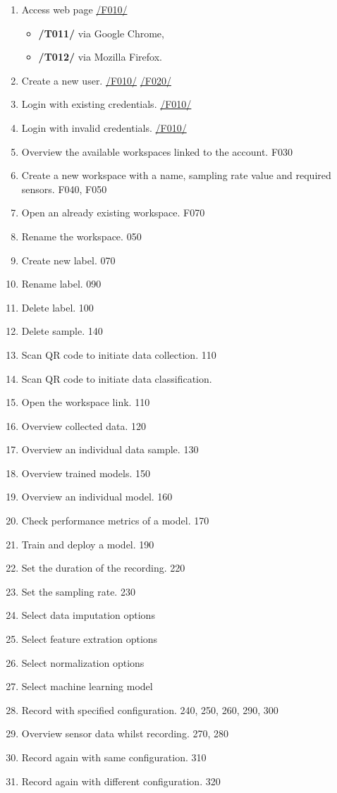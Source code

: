 \begin{enumerate}[{label = \textbf{/T{\protect\twodigits{\arabic{enumi}}}0/}, leftmargin = *}]
    \item Access web page \hyperref[welcome_page]{/F010/}
    \begin{itemize}
        \item \textbf{/T011/} via Google Chrome,
        \item \textbf{/T012/} via Mozilla Firefox.
    \end{itemize}
    \item Create a new user. \hyperref[welcome_page]{/F010/} \hyperref[registration_panel]{/F020/}
    \item Login with existing credentials. \hyperref[welcome_page]{/F010/}
    \item Login with invalid credentials. \hyperref[welcome_page]{/F010/}
    \item Overview the available workspaces linked to the account. F030
    \item Create a new workspace with a name, sampling rate value and required sensors. F040, F050 
    \item Open an already existing workspace. F070
    \item Rename the workspace. 050
    \item Create new label. 070
    \item Rename label. 090
    \item Delete label. 100
    \item Delete sample. 140
    \item Scan QR code to initiate data collection. 110
    \item Scan QR code to initiate data classification. 
    \item Open the workspace link. 110
    \item Overview collected data. 120
    \item Overview an individual data sample. 130
    \item Overview trained models. 150
    \item Overview an individual model. 160
    \item Check performance metrics of a model. 170
    \item Train and deploy a model. 190
    \item Set the duration of the recording. 220
    \item Set the sampling rate. 230
    \item Select data imputation options
    \item Select feature extration options
    \item Select normalization options
    \item Select machine learning model
    \item Record with specified configuration. 240, 250, 260, 290, 300
    \item Overview sensor data whilst recording. 270, 280
    \item Record again with same configuration. 310
    \item Record again with different configuration. 320
\end{enumerate}
